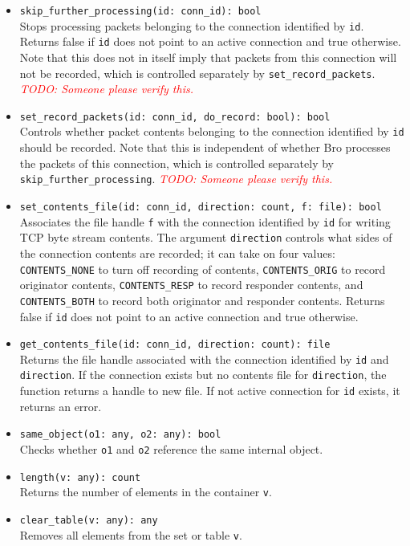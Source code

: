 \documentclass[10pt,landscape]{article}
\def\todo#1{\textit{\textcolor{red}{TODO: #1}}}
\begin{document}
\begin{multicols*}{2}
\begin{itemize}
  \item \verb|skip_further_processing(id: conn_id): bool|\\
    Stops processing packets belonging to the connection identified by
    \texttt{id}.
    Returns false if \texttt{id} does not point to an active connection and
    true otherwise.
    Note that this does not in itself imply that packets from this connection
    will not be recorded, which is controlled separately by
    \verb|set_record_packets|.
    \todo{Someone please verify this.}
  \item \verb|set_record_packets(id: conn_id, do_record: bool): bool|\\
    Controls whether packet contents belonging to the connection identified by
    \texttt{id} should be recorded.
    Note that this is independent of whether Bro processes the packets of this
    connection, which is controlled separately by
    \verb|skip_further_processing|.
    \todo{Someone please verify this.}
  \item \verb|set_contents_file(id: conn_id, direction: count, f: file): bool|\\
    Associates the file handle \texttt{f} with the connection identified by
    \texttt{id} for writing TCP byte stream contents. The argument
    \texttt{direction} controls what sides of the connection contents are
    recorded; it can take on four values:
    \verb|CONTENTS_NONE| to turn off recording of contents,
    \verb|CONTENTS_ORIG| to record originator contents,
    \verb|CONTENTS_RESP| to record responder contents,
    and \verb|CONTENTS_BOTH| to record both originator and responder contents.
    Returns false if \texttt{id} does not point to an active connection and
    true otherwise.
  \item \verb|get_contents_file(id: conn_id, direction: count): file|\\
    Returns the file handle associated with the connection identified by
    \texttt{id} and \texttt{direction}. If the connection exists but no
    contents file for \texttt{direction}, the function returns a handle to new
    file. If not active connection for \texttt{id} exists, it returns an error.
  \item \verb|same_object(o1: any, o2: any): bool|\\
    Checks whether \texttt{o1} and \texttt{o2} reference the same internal
    object.
  \item \verb|length(v: any): count|\\
    Returns the number of elements in the container \texttt{v}.
  \item \verb|clear_table(v: any): any|\\
    Removes all elements from the set or table \texttt{v}.
\end{itemize}


\end{multicols*}
\end{document}
